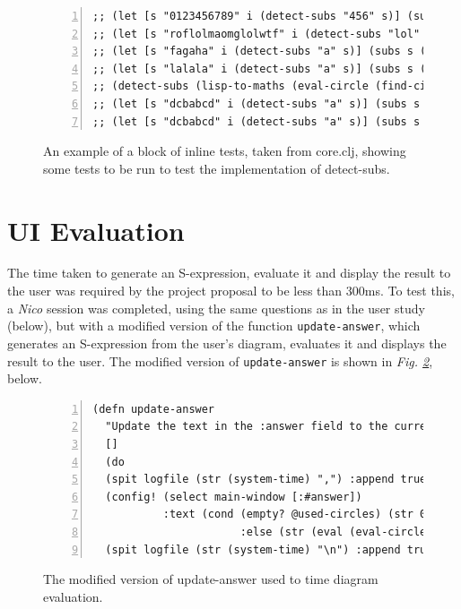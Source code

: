 \documentclass[12pt,twoside,notitlepage,xetex]{report}
\begin{document}
\begin{center}
\begin{figure}[H]
\begin{center}
\begin{minipage}{11.7cm}
\begin{Verbatim}[fontsize=\tiny,numbers=left]
;; (let [s "0123456789" i (detect-subs "456" s)] (subs s (:s (first i)) (:e (first i))))
;; (let [s "roflolmaomglolwtf" i (detect-subs "lol" s)] (subs s (:s (first i)) (:e (first i))))
;; (let [s "fagaha" i (detect-subs "a" s)] (subs s (:s (first i)) (:e (first i))))
;; (let [s "lalala" i (detect-subs "a" s)] (subs s (:s (first i)) (:e (first i))))
;; (detect-subs (lisp-to-maths (eval-circle (find-circle "c0"))) (lisp-to-maths (eval (:q (first @current-qset)))))
;; (let [s "dcbabcd" i (detect-subs "a" s)] (subs s (:s (first i)) (:e (first i))))
;; (let [s "dcbabcd" i (detect-subs "a" s)] (subs s (:s (nth i 1)) (:e (nth i 1))))

\end{Verbatim}
\end{minipage}
\end{center}
\caption{An example of a block of inline tests, taken from {\ttfamily core.clj}, showing some tests to be run to test the implementation of {\ttfamily detect-subs}.}
\label{fig:SlimeTests}
\end{figure}
\end{center}


\section{UI Evaluation}

The time taken to generate an S-expression, evaluate it and display the result to the user was required by the project proposal to be less than 300ms.  To test this, a \emph{Nico} session was completed, using the same questions as in the user study (below), but with a modified version of the function \verb¬update-answer¬, which generates an S-expression from the user's diagram, evaluates it and displays the result to the user.  The modified version of \verb¬update-answer¬ is shown in \emph{Fig. \ref{fig:TimeCode}}, below.

\begin{center}
\begin{figure}[H]
\begin{center}
\begin{minipage}{\textwidth-2cm}
\begin{Verbatim}[fontsize=\small,numbers=left]
(defn update-answer
  "Update the text in the :answer field to the current value of the diagram."
  []
  (do
  (spit logfile (str (system-time) ",") :append true) ;; log begin time
  (config! (select main-window [:#answer])
           :text (cond (empty? @used-circles) (str 0)
                       :else (str (eval (eval-circle (find-root))))))
  (spit logfile (str (system-time) "\n") :append true)));; log end time
\end{Verbatim}
\end{minipage}
\end{center}
\caption{The modified version of {\ttfamily update-answer} used to time diagram evaluation.}
\label{fig:TimeCode}
\end{figure}
\end{center}
\end{document}
